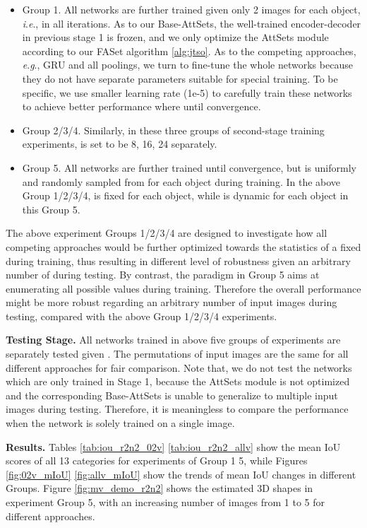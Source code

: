 \documentclass[twocolumn]{svjour3}    \pdfoutput=1
\newcommand{\nickname}{AttSets}
\newcommand{\faset}{FASet}
\newcommand{\ie}{\textit{i}.\textit{e}., }
\newcommand{\eg}{\textit{e}.\textit{g}., }
\begin{document}
\begin{itemize}[leftmargin=0.3cm]
\item Group 1. All networks are further trained given only 2 images for each object, \ie  in all iterations. As to our Base-AttSets, the well-trained encoder-decoder in previous stage 1 is frozen, and we only optimize the \nickname{} module according to our \faset{} algorithm \ref{alg:jtso}. As to the competing approaches, \eg GRU and all poolings, we turn to fine-tune the whole networks because they do not have separate parameters suitable for special training. To be specific, we use smaller learning rate (1e-5) to carefully train these networks to achieve better performance where  until convergence.

\item Group 2/3/4. Similarly, in these three groups of second-stage training experiments,  is set to be 8, 16, 24 separately. 

\item Group 5. All networks are further trained until convergence, but  is uniformly and randomly sampled from  for each object during training. In the above Group 1/2/3/4,  is fixed for each object, while  is dynamic for each object in this Group 5. 
\end{itemize}

The above experiment Groups 1/2/3/4 are designed to investigate how all competing approaches would be further optimized towards the statistics of a fixed  during training, thus resulting in different level of robustness given an arbitrary number of  during testing. By contrast, the paradigm in Group 5 aims at enumerating all possible  values during training. Therefore the overall performance might be more robust regarding an arbitrary number of input images during testing, compared with the above Group 1/2/3/4 experiments. 

\textbf{Testing Stage.}
All networks trained in above five groups of experiments are separately tested given . The permutations of input images are the same for all different approaches for fair comparison. Note that, we do not test the networks which are only trained in Stage 1, because the \nickname{} module is not optimized and the corresponding Base-AttSets is unable to generalize to multiple input images during testing. Therefore, it is meaningless to compare the performance when the network is solely trained on a single image.

\textbf{Results.} Tables \ref{tab:iou_r2n2_02v}  \ref{tab:iou_r2n2_allv} show the mean IoU scores of all 13 categories for experiments of Group 1  5, while Figures \ref{fig:02v_mIoU}  \ref{fig:allv_mIoU} show the trends of mean IoU changes in different Groups. Figure \ref{fig:mv_demo_r2n2} shows the estimated 3D shapes in experiment Group 5, with an increasing number of images from 1 to 5 for different approaches. 
\end{document}
